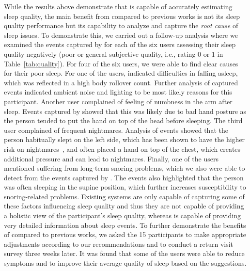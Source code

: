 While the results above demonstrate that {\systemname} is capable of accurately estimating sleep quality, the main benefit from {\systemname} compared to previous works is not its sleep quality performance but its capability to analyze and capture the {\em root cause} of sleep issues. To demonstrate this, we carried out a follow-up analysis where we examined the events captured by {\systemname} for each of the six users assessing their sleep quality negatively (poor or general subjective quality, i.e., rating 0 or 1 in Table~\ref{tab:quality}). For four of the six users, we were able to find clear causes for their poor sleep. For one of the users, {\systemname} indicated difficulties in falling asleep, which was reflected in a high body rollover count. Further analysis of captured events indicated ambient noise and lighting to be most likely reasons for this participant. Another user complained of feeling of numbness in the arm after sleep. Events captured by {\systemname} showed that this was likely due to bad hand posture as the person tended to put the hand on top of the head before sleeping. The third user complained of frequent nightmares. Analysis of {\systemname} events showed that the person habitually slept on the left side, which has been shown to have the higher risk on nightmares~\cite{nightmare}, and often placed a hand on top of the chest, which creates additional pressure and can lead to nightmares. Finally, one of the users mentioned suffering from long-term snoring problems, which we also were able to detect from the events captured by {\systemname}. The events also highlighted that the person was often sleeping in the supine position, which further increases susceptibility to snoring-related problems. Existing systems are only capable of capturing some of these factors influencing sleep quality and thus they are not capable of providing a holistic view of the participant's sleep quality, whereas {\systemname} is capable of providing very detailed information about sleep events. To further demonstrate the benefits of {\systemname} compared to previous works, we asked the 15 participants to make appropriate adjustments according to our recommendations and to conduct a return visit survey three weeks later. It was found that some of the users were able to reduce symptoms and to improve their average quality of sleep based on the suggestions.
	
